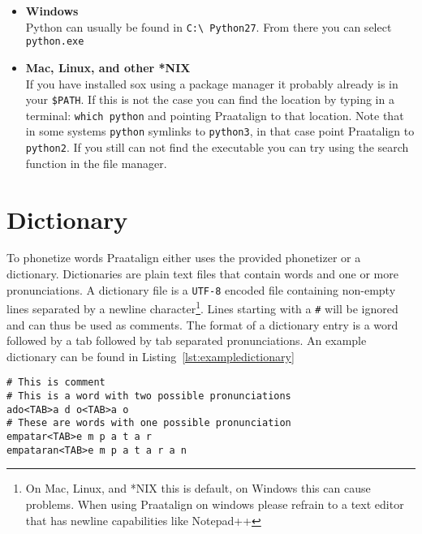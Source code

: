 \begin{itemize}
		\begin{itemize}
			\item \textbf{Windows}\\
				Python can usually be found in \texttt{C:\textbackslash{} Python27}.
				From there you can select \texttt{python.exe}
			\item \textbf{Mac, Linux, and other *NIX}\\
				If you have installed sox using a package manager it probably
				already is in your \texttt{\$PATH}. If this is not the case you can
				find the location by typing in a terminal: \texttt{which python}
				and pointing Praatalign to that location. Note that in some systems
				\texttt{python} symlinks to \texttt{python3}, in that case point
				Praatalign to \texttt{python2}. If you still can not find the
				executable you can try using the search function in the file
				manager.
		\end{itemize}
\end{itemize}

\section{Dictionary}
To phonetize words Praatalign either uses the provided phonetizer or a
dictionary. Dictionaries are plain text files that contain words and one or
more pronunciations. A dictionary file is a \texttt{UTF-8} encoded file
containing non-empty lines separated by a newline character\footnote{On Mac,
Linux, and *NIX this is default, on Windows this can cause problems. When using
Praatalign on windows please refrain to a text editor that has newline
capabilities like Notepad++}. Lines starting with a \texttt{\#} will be ignored
and can thus be used as comments. The format of a dictionary entry is a word
followed by a tab followed by tab separated pronunciations. An example
dictionary can be found in Listing~\ref{lst:exampledictionary}

\begin{lstlisting}[caption={Example dictionary},label={lst:exampledictionary}]
# This is comment
# This is a word with two possible pronunciations
ado<TAB>a d o<TAB>a o
# These are words with one possible pronunciation
empatar<TAB>e m p a t a r
empataran<TAB>e m p a t a r a n
\end{lstlisting}
	
